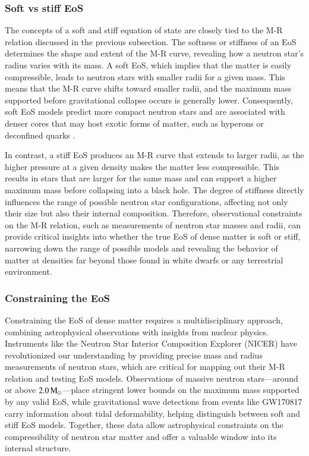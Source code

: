 \documentclass[main.tex]{subfiles}
\begin{document}
    \subsubsection{Soft vs stiff EoS}
    The concepts of a soft and stiff equation of state are closely tied to the M-R relation discussed in the previous subsection. The softness or stiffness of an EoS determines the shape and extent of the M-R curve, revealing how a neutron star's radius varies with its mass. A soft EoS, which implies that the matter is easily compressible, leads to neutron stars with smaller radii for a given mass. This means that the M-R curve shifts toward smaller radii, and the maximum mass supported before gravitational collapse occurs is generally lower. Consequently, soft EoS models predict more compact neutron stars and are associated with denser cores that may host exotic forms of matter, such as hyperons or deconfined quarks \citep[e.g., the curves labeled SQM1-3 in Fig.~\ref{fig:M-R} represent strange-quark matter models;][]{2001ApJ...550..426L}.

    In contrast, a stiff EoS produces an M-R curve that extends to larger radii, as the higher pressure at a given density makes the matter less compressible. This results in stars that are larger for the same mass and can support a higher maximum mass before collapsing into a black hole. The degree of stiffness directly influences the range of possible neutron star configurations, affecting not only their size but also their internal composition. Therefore, observational constraints on the M-R relation, such as measurements of neutron star masses and radii, can provide critical insights into whether the true EoS of dense matter is soft or stiff, narrowing down the range of possible models and revealing the behavior of matter at densities far beyond those found in white dwarfs or any terrestrial environment.
    
    
    \subsubsection{Constraining the EoS}
    Constraining the EoS of dense matter requires a multidisciplinary approach, combining astrophysical observations with insights from nuclear physics. Instruments like the Neutron Star Interior Composition Explorer (NICER) have revolutionized our understanding by providing precise mass and radius measurements of neutron stars, which are critical for mapping out their M-R relation and testing EoS models. Observations of massive neutron stars---around or above $2.0\mathrm{\,M_\odot}$---place stringent lower bounds on the maximum mass supported by any valid EoS, while gravitational wave detections from events like GW170817 \citep{PhysRevLett.119.161101} carry information about tidal deformability, helping distinguish between soft and stiff EoS models. Together, these data allow astrophysical constraints on the compressibility of neutron star matter and offer a valuable window into its internal structure.
\end{document}
